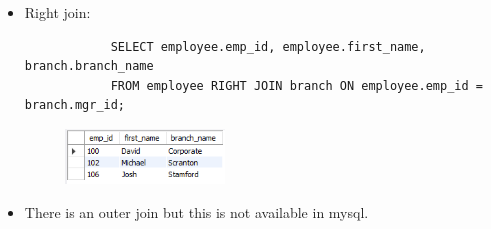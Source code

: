 \begin{itemize}
    \item Right join:
        \begin{verbatim}
            SELECT employee.emp_id, employee.first_name, branch.branch_name 
            FROM employee RIGHT JOIN branch ON employee.emp_id = branch.mgr_id;
        \end{verbatim}
        \begin{figure}[H]
            \centering
            \includegraphics[width=0.4\textwidth]{./Figs/2020-12-24-21-05-51.png}
        \end{figure}
    
    \item There is an outer join but this is not available in mysql.
\end{itemize}

